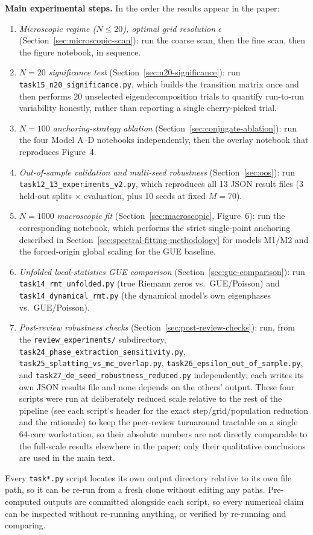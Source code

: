 \documentclass[mca,article,submit,oneauthor,pdftex]{Definitions/mdpi}
\begin{document}
\textbf{Main experimental steps.} In the order the results appear in the
paper:
\begin{enumerate}
\item \emph{Microscopic regime ($N\le20$), optimal grid resolution
$\epsilon$} (Section~\ref{sec:microscopic-scan}): run the coarse scan, then
the fine scan, then the figure notebook, in sequence.
\item \emph{$N=20$ significance test} (Section~\ref{sec:n20-significance}):
run \texttt{task15\_n20\_significance.py}, which builds the transition
matrix once and then performs 20 unselected eigendecomposition trials to
quantify run-to-run variability honestly, rather than reporting a single
cherry-picked trial.
\item \emph{$N=100$ anchoring-strategy ablation}
(Section~\ref{sec:conjugate-ablation}): run the four Model A--D notebooks
independently, then the overlay notebook that reproduces Figure~4.
\item \emph{Out-of-sample validation and multi-seed robustness}
(Section~\ref{sec:oos}): run \texttt{task12\_13\_experiments\_v2.py}, which
reproduces all 13 JSON result files (3 held-out splits $\times$ evaluation,
plus 10 seeds at fixed $M=70$).
\item \emph{$N=1000$ macroscopic fit} (Section~\ref{sec:macroscopic},
Figure~6): run the corresponding notebook, which performs the strict
single-point anchoring described in
Section~\ref{sec:spectral-fitting-methodology} for models M1/M2 and the
forced-origin global scaling for the GUE baseline.
\item \emph{Unfolded local-statistics GUE comparison}
(Section~\ref{sec:gue-comparison}): run \texttt{task14\_rmt\_unfolded.py}
(true Riemann zeros vs.\ GUE/Poisson) and \texttt{task14\_dynamical\_rmt.py}
(the dynamical model's own eigenphases vs.\ GUE/Poisson).
\item \emph{Post-review robustness checks}
(Section~\ref{sec:post-review-checks}): run, from the
\texttt{review\_experiments/} subdirectory,
\texttt{task24\_phase\_extraction\_sensitivity.py},
\texttt{task25\_splatting\_vs\_mc\_overlap.py},
\texttt{task26\_epsilon\_out\_of\_sample.py}, and
\texttt{task27\_de\_seed\_robustness\_reduced.py} independently; each
writes its own JSON results file and none depends on the others' output.
These four scripts were run at deliberately reduced scale relative to the
rest of the pipeline (see each script's header for the exact
step/grid/population reduction and the rationale) to keep the peer-review
turnaround tractable on a single 64-core workstation, so their absolute
numbers are not directly comparable to the full-scale results elsewhere
in the paper; only their qualitative conclusions are used in the main
text.
\end{enumerate}
Every \texttt{task*.py} script locates its own output directory relative to
its own file path, so it can be re-run from a fresh clone without editing any
paths. Pre-computed outputs are committed alongside each script, so every
numerical claim can be inspected without re-running anything, or verified by
re-running and comparing.
\end{document}
